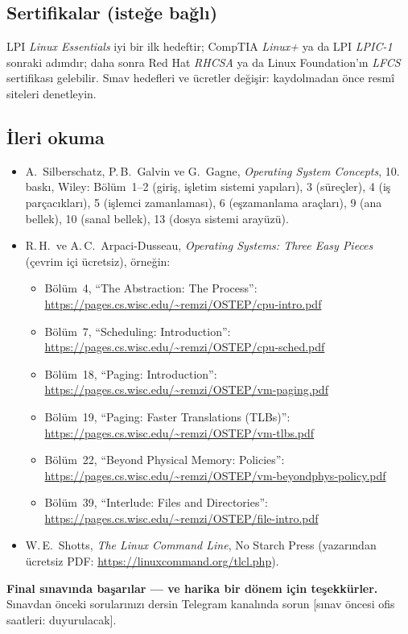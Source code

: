 \documentclass[11pt,a4paper]{article}
\begin{document}
\subsection*{Sertifikalar (isteğe bağlı)}
LPI \emph{Linux Essentials} iyi bir ilk hedeftir; CompTIA \emph{Linux+} ya da LPI \emph{LPIC-1} sonraki adımdır; daha sonra Red Hat \emph{RHCSA} ya da Linux Foundation'ın \emph{LFCS} sertifikası gelebilir. Sınav hedefleri ve ücretler değişir: kaydolmadan önce resmî siteleri denetleyin.

\subsection*{İleri okuma}
\begin{itemize}
  \item A.\ Silberschatz, P.\,B.\ Galvin ve G.\ Gagne, \emph{Operating System Concepts}, 10. baskı, Wiley: Bölüm~1--2 (giriş, işletim sistemi yapıları), 3 (süreçler), 4 (iş parçacıkları), 5 (işlemci zamanlaması), 6 (eşzamanlama araçları), 9 (ana bellek), 10 (sanal bellek), 13 (dosya sistemi arayüzü).
  \item R.\,H.\ ve A.\,C.\ Arpaci-Dusseau, \emph{Operating Systems: Three Easy Pieces} (çevrim içi ücretsiz), örneğin:
  \begin{itemize}
    \item Bölüm~4, ``The Abstraction: The Process'': \url{https://pages.cs.wisc.edu/~remzi/OSTEP/cpu-intro.pdf}
    \item Bölüm~7, ``Scheduling: Introduction'': \url{https://pages.cs.wisc.edu/~remzi/OSTEP/cpu-sched.pdf}
    \item Bölüm~18, ``Paging: Introduction'': \url{https://pages.cs.wisc.edu/~remzi/OSTEP/vm-paging.pdf}
    \item Bölüm~19, ``Paging: Faster Translations (TLBs)'': \url{https://pages.cs.wisc.edu/~remzi/OSTEP/vm-tlbs.pdf}
    \item Bölüm~22, ``Beyond Physical Memory: Policies'': \url{https://pages.cs.wisc.edu/~remzi/OSTEP/vm-beyondphys-policy.pdf}
    \item Bölüm~39, ``Interlude: Files and Directories'': \url{https://pages.cs.wisc.edu/~remzi/OSTEP/file-intro.pdf}
  \end{itemize}
  \item W.\,E.\ Shotts, \emph{The Linux Command Line}, No Starch Press (yazarından ücretsiz PDF: \url{https://linuxcommand.org/tlcl.php}).
\end{itemize}

\textbf{Final sınavında başarılar --- ve harika bir dönem için teşekkürler.} Sınavdan önceki sorularınızı dersin Telegram kanalında sorun [sınav öncesi ofis saatleri: duyurulacak].
\end{document}
